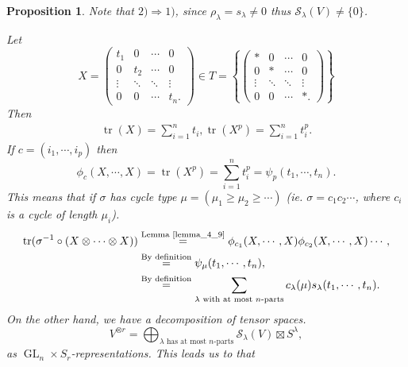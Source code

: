 \documentclass[10pt]{article}
\newtheorem{proposition}{Proposition}[section]
\numberwithin{equation}{theorem}
\DeclareMathOperator{\tr}{tr}
\DeclareMathOperator{\GL}{GL}
\begin{document}
\begin{proposition}
  Note that $2)\Rightarrow 1)$, since $\rho_\lambda=s_\lambda \not=0$ thus $\mathcal{S}_\lambda(V) \not = \{0\}$.\\
  \par Let 
  \begin{equation*}
    X = \begin{pmatrix}
      t_1 & 0 & \cdots & 0 \\
      0 & t_2 & \cdots & 0 \\
      \vdots & \ddots & \ddots & \vdots \\
      0 & 0 & \cdots & t_n.
    \end{pmatrix}
    \in T = \left\{\begin{pmatrix}
      \ast & 0 & \cdots & 0 \\
      0 & \ast & \cdots & 0 \\
      \vdots & \ddots & \ddots & \vdots \\
      0 & 0 & \cdots & \ast.
    \end{pmatrix}\right\}
  \end{equation*}
  Then 
  \begin{align*}
    \tr(X) = \sum_{i=1}^n t_i, \tr(X^p)=\sum_{i=1}^nt_i^p.
  \end{align*}
  If $c=(i_1,\cdots,i_p)$ then 
  \begin{equation*}
    \phi_c(X,\cdots,X) = \tr(X^p) = \sum_{i=1}^n t_i^p = \psi_p(t_1,\cdots,t_n).
  \end{equation*}
  This means that if $\sigma$ has cycle type $\mu= (\mu_1\geq \mu_2\geq\cdots)$ (ie. $\sigma = c_1c_2\cdots$, where $c_i$ is a cycle of length $\mu_i$).
  \begin{align*}
    \tr(\sigma^{-1}\circ(X\otimes \cdots\otimes X)) &\stackrel{\text{Lemma \ref{lemma_4_9}}}{=}\phi_{c_1}(X,\cdots, X)\phi_{c_2}(X,\cdots,X)\cdots,\\
    & \stackrel{\text{By definition}}{=}\psi_{\mu}(t_1,\cdots,t_n),\\
    & \stackrel{\text{By definition}}{=}\sum_{\text{$\lambda$ with at most $n$-parts}}c_\lambda(\mu)s_\lambda(t_1,\cdots,t_n).
  \end{align*}
  On the other hand, we have a decomposition of tensor spaces. 
  \begin{equation*}
    V^{\otimes r} = \bigoplus_{\text{$\lambda$ has at most $n$-parts}}\mathcal{S}_\lambda(V)\boxtimes S^\lambda,
  \end{equation*}
  as $\GL_n\times S_r$-representations. This leads us to that 

\end{proposition}
\end{document}
